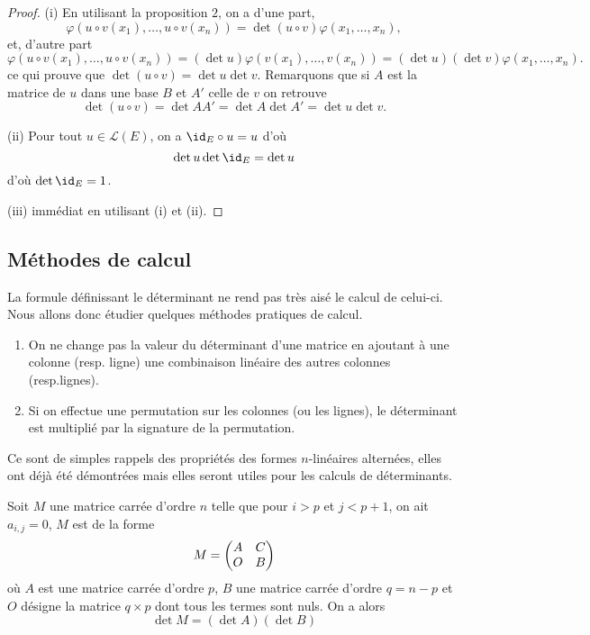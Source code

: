 \documentclass[class=report,crop=false]{standalone}
\begin{document}
\begin{proof}
(i) En utilisant la proposition $2$, on a d'une part,
$$\varphi(u\circ v(x_1),\dots,u\circ v(x_n))=\det(u\circ v)\varphi(x_1,\dots,x_n),$$
et, d'autre part
$$\varphi(u\circ v(x_1),\dots,u\circ v(x_n))=(\det u)\varphi(v(x_1),\dots,v(x_n))=(\det u)(\det v)\varphi(x_1,\dots,x_n).$$
ce qui prouve que $\det(u\circ v)=\det u\det v$. Remarquons que si $A$ est la matrice de $u$ dans une base $B$ et $A'$ celle de $v$ on retrouve 
$$\det(u\circ v)=\det AA'=\det A\det A'=\det u\det v.$$

(ii) Pour tout $u\in \mathcal{L}(E)$, on a $\id_E\circ u=u$ d'où
$$\det u\det\id_E=\det u$$
d'où $\det \id_E =1$.

(iii) immédiat en utilisant (i) et (ii).
\end{proof}





\subsection{Méthodes de calcul}

La formule définissant le déterminant ne rend pas très aisé le 
calcul de celui-ci. Nous allons donc étudier quelques méthodes pratiques de calcul.

\begin{proposition}
\begin{enumerate}
  \item On ne change pas la valeur du déterminant d'une matrice 
  en ajoutant à une colonne (resp. ligne) 
une combinaison linéaire des autres colonnes (resp.lignes).
  
  \item Si on effectue une permutation sur les colonnes (ou les lignes), 
  le déterminant est multiplié 
par la signature de la permutation.
\end{enumerate}
  
\end{proposition}

Ce sont de simples rappels des propriétés des formes $n$-linéaires alternées, 
elles ont déjà été démontrées mais elles seront utiles pour les calculs de déterminants.

\begin{theoreme}
Soit $M$ une matrice carrée d'ordre $n$ telle que pour
$i>p$ et $j<p+1$, on ait $a_{i,j}=0$, $M$ est de la forme 
$$M=\left(\begin{matrix}A&C\cr O&B\cr\end{matrix}\right)$$
où $A$ est une matrice carrée d'ordre $p$, $B$ une matrice carrée d'ordre $q=n-p$ et $O$ désigne la 
matrice $q\times p$ dont tous les termes sont nuls. On a alors
$$\det M=(\det A)(\det B)$$
\end{theoreme}  
\end{document}
